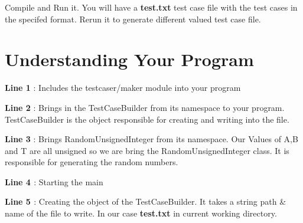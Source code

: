 \begin{DoxyCode}{0}
\DoxyCodeLine{\textcolor{preprocessor}{\#include <testcaser/maker>}}
\DoxyCodeLine{}
\DoxyCodeLine{}
\DoxyCodeLine{}
\DoxyCodeLine{}
\DoxyCodeLine{}
\DoxyCodeLine{\}}
\DoxyCodeLine{}
\DoxyCodeLine{}
\DoxyCodeLine{\}}
\end{DoxyCode}


Compile and Run it. You will have a {\bfseries{test.\+txt}} test case file with the test cases in the specifed format. Rerun it to generate different valued test case file.

\DoxyHorRuler
\hypertarget{index_under_standing}{}\section{Understanding Your Program}\label{index_under_standing}
{\bfseries{Line 1}} \+: Includes the {\ttfamily testcaser/maker} module into your program

{\bfseries{Line 2}} \+: Brings in the Test\+Case\+Builder from its namespace to your program. Test\+Case\+Builder is the object responsible for creating and writing into the file.

{\bfseries{Line 3}} \+: Brings Random\+Unsigned\+Integer from its namespace. Our Values of A,B and T are all unsigned so we are bring the Random\+Unsigned\+Integer class. It is responsible for generating the random numbers.

{\bfseries{Line 4 }} \+: Starting the main

{\bfseries{Line 5 }} \+: Creating the object of the Test\+Case\+Builder. It takes a string path \& name of the file to write. In our case {\bfseries{test.\+txt}} in current working directory.

